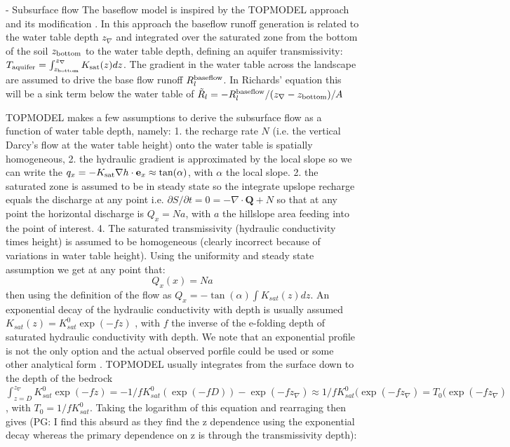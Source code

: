 \documentclass[twoside,10pt]{report}
\begin{document}
- Subsurface flow
The baseflow model is inspired by the TOPMODEL approach and its modification \citep{Gedney2003}. In this approach the baseflow runoff generation is related to the water table depth $z_{\nabla}$ and integrated over the saturated zone from the bottom of the soil $z_{\rm bottom}$ to the water table depth, defining an aquifer transmissivity: $T_{\rm aquifer} = \int_{z_{\rm bottom}}^{z_{\nabla}} K_{\rm sat}(z)dz$. The gradient in the water table across the landscape are assumed to drive the base flow runoff $R_l^{\rm baseflow}$. In Richards' equation this will be a sink term below the water table of $\tilde R_l = -R_l^{\rm baseflow}/(z_{\nabla} - z_{\rm bottom})/A$ 

TOPMODEL makes a few assumptions to derive the subsurface flow as a function of water table depth, namely: 1. the recharge rate $N$ (i.e. the vertical Darcy's flow at the water table height) onto the water table is spatially homogeneous, 2. the hydraulic gradient is approximated by the local slope so we can write the $q_x = -K_{\rm sat}\nabla h \cdot \mathbf{e}_x \approx \rm tan (\alpha) $, with $\alpha$ the local slope. 2. the saturated zone is assumed to be in steady state so the integrate upslope recharge equals the discharge at any point i.e. $\partial S/\partial t = 0 = -\nabla \cdot \mathbf{Q} + N$ so that at any point the horizontal discharge is $Q_x = N a$, with $a$ the hillslope area feeding into the point of interest. 4. The saturated transmissivity (hydraulic conductivity times height) is assumed to be homogeneous (clearly incorrect because of variations in water table height).
Using the uniformity and steady state assumption we get at any point that:
\begin{equation}
    Q_x(x) = N a
\end{equation}
then using the definition of the flow as $Q_x = - \tan(\alpha)\int K_{sat}(z) dz$. An exponential decay of the hydraulic conductivity with depth is usually assumed $ K_{sat}(z)=K_{sat}^0 \exp(-f z)$ \citep{Ambroise96}, with $f$ the inverse of the e-folding depth of saturated hydraulic conductivity with depth. We note that an exponential profile is not the only option and the actual observed porfile could be used or some other analytical form \citep{Ambroise96}.
TOPMODEL usually integrates from the surface down to the depth of the bedrock $\int_{z=D}^{z_{\nabla}} K_{sat}^0 \exp(-f z) = -1/f K_{sat}^0 (\exp(-f D)) - \exp(-f z_{\nabla})\approx 1/f K_{sat}^0 (\exp(-f z_{\nabla}) = T_0 (\exp(-f z_{\nabla})$, with $T_0 = 1/f K_{sat}^0$.
Taking the logarithm of this equation and rearraging then gives (PG: I find this absurd as they find the z dependence using the exponential decay whereas the primary dependence on z is through the transmissivity depth):
\end{document}

